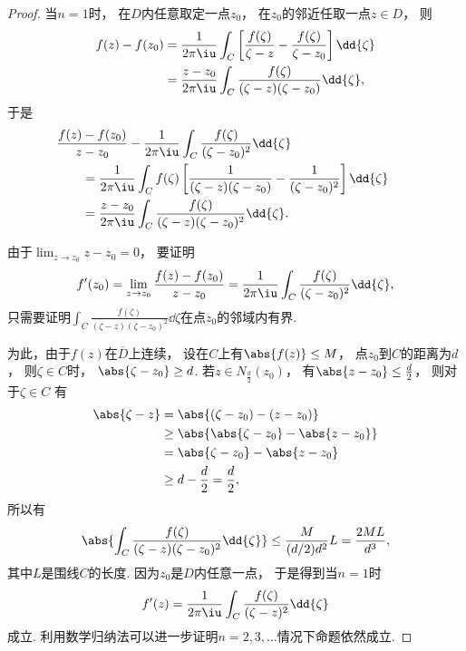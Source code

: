 \begin{theorem}
\begin{proof}
当\(n=1\)时，
在\(D\)内任意取定一点\(z_0\)，
在\(z_0\)的邻近任取一点\(z \in D\)，
则\begin{align*}
	f(z)-f(z_0)
	&= \frac{1}{2\pi\iu}
		\int_C \left[
			\frac{f(\zeta)}{\zeta-z}
			- \frac{f(\zeta)}{\zeta-z_0}
		\right] \dd{\zeta} \\
	&= \frac{z-z_0}{2\pi\iu}
		\int_C \frac{f(\zeta)}{(\zeta-z)(\zeta-z_0)} \dd{\zeta},
\end{align*}
于是\begin{align*}
	&\hspace{-20pt}
		\frac{f(z)-f(z_0)}{z-z_0}
		- \frac{1}{2\pi\iu}
		\int_C \frac{f(\zeta)}{(\zeta-z_0)^2} \dd{\zeta} \\
	&=\frac{1}{2\pi\iu}
		\int_C f(\zeta)
		\left[
			\frac{1}{(\zeta-z)(\zeta-z_0)}-\frac{1}{(\zeta-z_0)^2}
		\right] \dd{\zeta} \\
	&=\frac{z-z_0}{2\pi\iu}
		\int_C \frac{f(\zeta)}{(\zeta-z)(\zeta-z_0)^2} \dd{\zeta}.
\end{align*}

由于\(\lim_{z \to z_0} z-z_0 = 0\)，
要证明\begin{equation*}
	f'(z_0) = \lim_{z \to z_0} \frac{f(z)-f(z_0)}{z-z_0}
	= \frac{1}{2\pi\iu} \int_C \frac{f(\zeta)}{(\zeta-z_0)^2} \dd{\zeta},
\end{equation*}
只需要证明\(\int_C \frac{f(\zeta)}{(\zeta-z)(\zeta-z_0)^2} \dd{\zeta}\)在点\(z_0\)的邻域内有界.

为此，由于\(f(z)\)在\(\overline{D}\)上连续，
设在\(C\)上有\(\abs{f(z)} \leq M\)，
点\(z_0\)到\(C\)的距离为\(d\)，
则\(\zeta \in C\)时，
\(\abs{\zeta-z_0} \geq d\).
若\(z \in N_{\frac{d}{2}}(z_0)\)，
有\(\abs{z-z_0} \leq \frac{d}{2}\)，
则对于\(\zeta \in C\)
有\begin{align*}
	\abs{\zeta-z}
	&= \abs{(\zeta-z_0)-(z-z_0)} \\
	&\geq \abs{ \abs{\zeta-z_0} - \abs{z-z_0} } \\
	&= \abs{\zeta-z_0} - \abs{z-z_0} \\
	&\geq d - \frac{d}{2} = \frac{d}{2},
\end{align*}
所以有\begin{equation*}
	\abs{\int_C \frac{f(\zeta)}{(\zeta-z)(\zeta-z_0)^2} \dd{\zeta}}
	\leq \frac{M}{(d/2) d^2} L
	= \frac{2ML}{d^3},
\end{equation*}
其中\(L\)是围线\(C\)的长度.
因为\(z_0\)是\(D\)内任意一点，
于是得到当\(n=1\)时\begin{equation*}
	f'(z) = \frac{1}{2\pi\iu} \int_C{\frac{f(\zeta)}{(\zeta-z)^2}\dd{\zeta}}
\end{equation*}成立.
利用数学归纳法可以进一步证明\(n=2,3,\dots\)情况下命题依然成立.
\end{proof}
\end{theorem}

